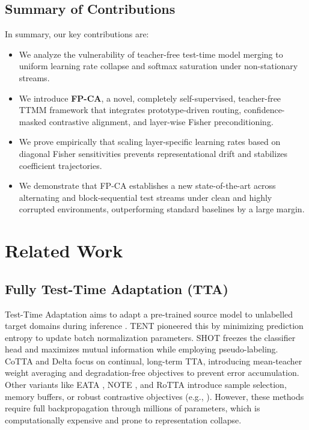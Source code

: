 \documentclass{article}
\theoremstyle{plain}
\theoremstyle{definition}
\theoremstyle{remark}
\begin{document}
\subsection{Summary of Contributions}
In summary, our key contributions are:
\begin{itemize}
  \item We analyze the vulnerability of teacher-free test-time model merging to uniform learning rate collapse and softmax saturation under non-stationary streams.
  \item We introduce \textbf{FP-CA}, a novel, completely self-supervised, teacher-free TTMM framework that integrates prototype-driven routing, confidence-masked contrastive alignment, and layer-wise Fisher preconditioning.
  \item We prove empirically that scaling layer-specific learning rates based on diagonal Fisher sensitivities prevents representational drift and stabilizes coefficient trajectories.
  \item We demonstrate that FP-CA establishes a new state-of-the-art across alternating and block-sequential test streams under clean and highly corrupted environments, outperforming standard baselines by a large margin.
\end{itemize}

\section{Related Work}
\label{related}

\subsection{Fully Test-Time Adaptation (TTA)}
Test-Time Adaptation aims to adapt a pre-trained source model to unlabelled target domains during inference \cite{liang2020shot, wang2021tent, karmanov2024efficient, boudiaf2022parameterfree, mounsaveng2023tricks, gan2022decorate, press2023rdumb}. TENT \cite{wang2021tent} pioneered this by minimizing prediction entropy to update batch normalization parameters. SHOT \cite{liang2020shot} freezes the classifier head and maximizes mutual information while employing pseudo-labeling. CoTTA \cite{wang2022continual} and Delta \cite{zhao2023delta} focus on continual, long-term TTA, introducing mean-teacher weight averaging and degradation-free objectives to prevent error accumulation. Other variants like EATA \cite{niu2023towards}, NOTE \cite{gong2022note}, and RoTTA \cite{yuan2023robust} introduce sample selection, memory buffers, or robust contrastive objectives (e.g., \cite{chen2022contrastive, lee2024entropy, zhou2025bayesian, lee2024becotta, zhang2024dpcore, ye2025domain, cui2025online, guo2025smoothing}). However, these methods require full backpropagation through millions of parameters, which is computationally expensive and prone to representation collapse.
\end{document}
